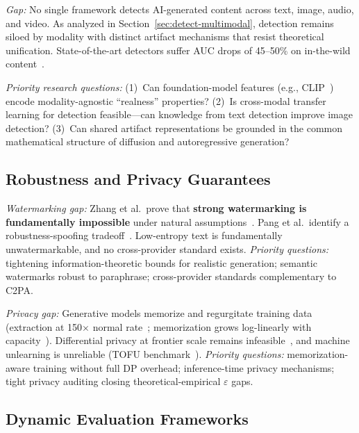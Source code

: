 \emph{Gap:} No single framework detects AI-generated content across text, image, audio, and video. As analyzed in Section~\ref{sec:detect-multimodal}, detection remains siloed by modality with distinct artifact mechanisms that resist theoretical unification. State-of-the-art detectors suffer AUC drops of 45--50\% on in-the-wild content~\cite{chandra2025deepfakeeval}.

\emph{Priority research questions:} (1)~Can foundation-model features (e.g., CLIP~\cite{ojha2023univfd}) encode modality-agnostic ``realness'' properties? (2)~Is cross-modal transfer learning for detection feasible---can knowledge from text detection improve image detection? (3)~Can shared artifact representations be grounded in the common mathematical structure of diffusion and autoregressive generation?


\subsection{Robustness and Privacy Guarantees}
\label{sec:future-robustness}

\emph{Watermarking gap:} Zhang et al.\ prove that \textbf{strong watermarking is fundamentally impossible} under natural assumptions~\cite{zhang2024impossibility}. Pang et al.\ identify a robustness-spoofing tradeoff~\cite{pang2024nofree}. Low-entropy text is fundamentally unwatermarkable, and no cross-provider standard exists. \emph{Priority questions:} tightening information-theoretic bounds for realistic generation; semantic watermarks robust to paraphrase; cross-provider standards complementary to C2PA.

\emph{Privacy gap:} Generative models memorize and regurgitate training data (extraction at 150$\times$ normal rate~\cite{nasr2025extraction}; memorization grows log-linearly with capacity~\cite{carlini2023quantifying}). Differential privacy at frontier scale remains infeasible~\cite{tramer2024dpposition}, and machine unlearning is unreliable (TOFU benchmark~\cite{maini2024tofu}). \emph{Priority questions:} memorization-aware training without full DP overhead; inference-time privacy mechanisms; tight privacy auditing closing theoretical-empirical $\varepsilon$ gaps.


\subsection{Dynamic Evaluation Frameworks}
\label{sec:future-eval}

